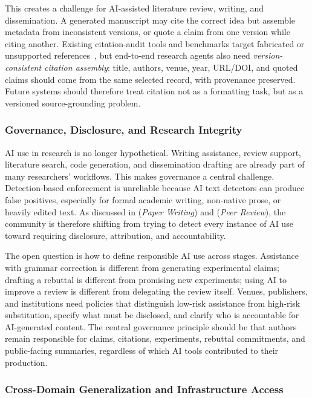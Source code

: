 \documentclass{llmxive}
\providecommand{\levelbadge}[2]{  \tcbox[on line, nobeforeafter, tcbox raise base,
         boxsep=0pt, left=2pt, right=2pt, top=0.5pt, bottom=0.5pt,
         arc=1.5pt, boxrule=0.3pt,
         colback=#1!15, colframe=#1!70]    {\scriptsize\bfseries\sffamily#2}}
\providecommand{\Sfive}{\texorpdfstring{\levelbadge{S5color}{S5}}{S5}\xspace}
\providecommand{\Ssix}{\texorpdfstring{\levelbadge{S6color}{S6}}{S6}\xspace}
\begin{document}
This creates a challenge for AI-assisted literature review, writing, and dissemination. A generated manuscript may cite the correct idea but assemble metadata from inconsistent versions, or quote a claim from one version while citing another. Existing citation-audit tools and benchmarks target fabricated or unsupported references~\cite{citeme2024,scholarcop2025}, but end-to-end research agents also need \emph{version-consistent citation assembly}: title, authors, venue, year, URL/DOI, and quoted claims should come from the same selected record, with provenance preserved. Future systems should therefore treat citation not as a formatting task, but as a versioned source-grounding problem.


\subsubsection{Governance, Disclosure, and Research Integrity}

AI use in research is no longer hypothetical. Writing assistance, review support, literature search, code generation, and dissemination drafting are already part of many researchers' workflows. This makes governance a central challenge. Detection-based enforcement is unreliable because AI text detectors can produce false positives, especially for formal academic writing, non-native prose, or heavily edited text. As discussed in \Sfive (\emph{Paper Writing}) and \Ssix (\emph{Peer Review}), the community is therefore shifting from trying to detect every instance of AI use toward requiring disclosure, attribution, and accountability.

The open question is how to define responsible AI use across stages. Assistance with grammar correction is different from generating experimental claims; drafting a rebuttal is different from promising new experiments; using AI to improve a review is different from delegating the review itself. Venues, publishers, and institutions need policies that distinguish low-risk assistance from high-risk substitution, specify what must be disclosed, and clarify who is accountable for AI-generated content. The central governance principle should be that authors remain responsible for claims, citations, experiments, rebuttal commitments, and public-facing summaries, regardless of which AI tools contributed to their production.


\subsubsection{Cross-Domain Generalization and Infrastructure Access}
\end{document}
